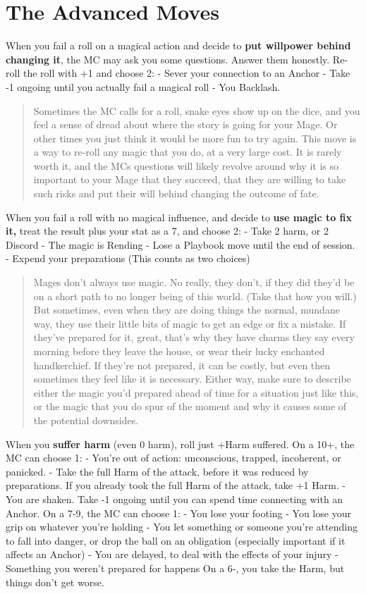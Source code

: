\documentclass[
]{memoir}
\begin{document}
\hypertarget{the-advanced-moves}{%
\section{The Advanced Moves}\label{the-advanced-moves}}

When you fail a roll on a magical action and decide to \textbf{put
willpower behind changing it}, the MC may ask you some questions. Answer
them honestly. Re-roll the roll with +1 and choose 2: - Sever your
connection to an Anchor - Take -1 ongoing until you actually fail a
magical roll - You Backlash.

\begin{quote}
Sometimes the MC calls for a roll, snake eyes show up on the dice, and
you feel a sense of dread about where the story is going for your Mage.
Or other times you just think it would be more fun to try again. This
move is a way to re-roll any magic that you do, at a very large cost. It
is rarely worth it, and the MCs questions will likely revolve around why
it is so important to your Mage that they succeed, that they are willing
to take such risks and put their will behind changing the outcome of
fate.
\end{quote}

When you fail a roll with no magical influence, and decide to
\textbf{use magic to fix it,} treat the result plus your stat as a 7,
and choose 2: - Take 2 harm, or 2 Discord - The magic is Rending - Lose
a Playbook move until the end of session. - Expend your preparations
(This counts as two choices)

\begin{quote}
Mages don't always use magic. No really, they don't, if they did they'd
be on a short path to no longer being of this world. (Take that how you
will.) But sometimes, even when they are doing things the normal,
mundane way, they use their little bits of magic to get an edge or fix a
mistake. If they've prepared for it, great, that's why they have charms
they say every morning before they leave the house, or wear their lucky
enchanted handkerchief. If they're not prepared, it can be costly, but
even then sometimes they feel like it is necessary. Either way, make
sure to describe either the magic you'd prepared ahead of time for a
situation just like this, or the magic that you do spur of the moment
and why it causes some of the potential downsides.
\end{quote}

When you \textbf{suffer harm} (even 0 harm), roll just +Harm suffered.
On a 10+, the MC can choose 1: - You're out of action: unconscious,
trapped, incoherent, or panicked. - Take the full Harm of the attack,
before it was reduced by preparations. If you already took the full Harm
of the attack, take +1 Harm. - You are shaken. Take -1 ongoing until you
can spend time connecting with an Anchor. On a 7-9, the MC can choose 1:
- You lose your footing - You lose your grip on whatever you're holding
- You let something or someone you're attending to fall into danger, or
drop the ball on an obligation (especially important if it affects an
Anchor) - You are delayed, to deal with the effects of your injury -
Something you weren't prepared for happens On a 6-, you take the Harm,
but things don't get worse.
\end{document}
